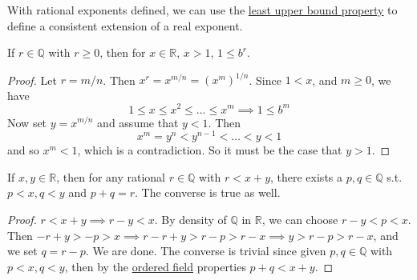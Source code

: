   With rational exponents defined, we can use the \hyperref[def:least-upper-bound-property]{least upper bound property} to define a consistent extension of a real exponent. 
  
  \begin{lemma}
    \label{thm:monotonicity-of-rational-powers}
 
    If $r \in \mathbb{Q}$ with $r \geq 0$, then for $x \in \mathbb{R}$, $x > 1$, $1 \leq b^r$. 
  \end{lemma}
  \begin{proof}
    Let $r = m/n$. Then $x^r = x^{m/n} = (x^m)^{1/n}$. Since $1 < x$, and $m \geq 0$, we have 
    \begin{equation}
      1 \leq x \leq x^2 \leq \ldots \leq x^m \implies 1 \leq b^m
    \end{equation}
    Now set $y = x^{m/n}$ and assume that $y < 1$. Then 
    \begin{equation}
      x^m = y^n < y^{n-1} < \ldots < y < 1
    \end{equation}
    and so $x^m < 1$, which is a contradiction. So it must be the case that $y > 1$. 
  \end{proof}

  \begin{lemma}
    \label{thm:monotonicity-of-rational-exponents}
    If $x, y \in \mathbb{R}$, then for any rational $r \in \mathbb{Q}$ with $r < x + y$, there exists a $p, q \in \mathbb{Q}$ s.t. $p < x, q < y$ and $p + q = r$. The converse is true as well. 
  \end{lemma}
  \begin{proof}
    $r < x + y \implies r - y < x$. By density of $\mathbb{Q}$ in $\mathbb{R}$, we can choose $r - y < p < x$. Then $-r + y > -p > x \implies r - r + y > r - p > r - x \implies y > r - p > r - x$, and we set $q = r - p$. We are done. The converse is trivial since given $p, q \in \mathbb{Q}$ with $p < x, q < y$, then by the \hyperref[alg-def:ordered-field]{ordered field} properties $p + q < x + y$. 
  \end{proof}

